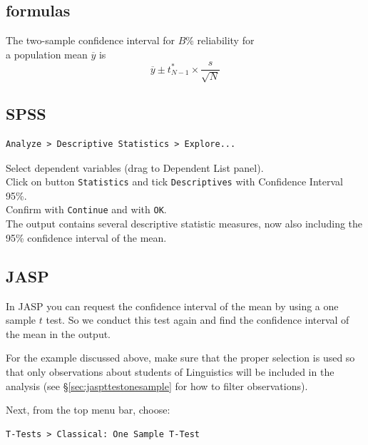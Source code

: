 \documentclass[
]{book}
\begin{document}
\hypertarget{sec:formulas13-2}{%
\subsection{formulas}\label{sec:formulas13-2}}

The two-sample confidence interval for \(B\)\% reliability for\\
a population mean \(\overline{y}\) is
\begin{equation}
    \overline{y} \pm t^*_{N-1} \times \frac{s}{\sqrt{N}}
  \label{eq:t-onesampleCI}
\end{equation}

\hypertarget{spss-11}{%
\subsection{SPSS}\label{spss-11}}

\begin{verbatim}
Analyze > Descriptive Statistics > Explore...
\end{verbatim}

Select dependent variables (drag to Dependent List panel).\\
Click on button \texttt{Statistics} and tick \texttt{Descriptives} with Confidence Interval
95\%.\\
Confirm with \texttt{Continue} and with \texttt{OK}.\\
The output contains several descriptive statistic measures, now also
including the 95\% confidence interval of the mean.

\hypertarget{jasp-11}{%
\subsection{JASP}\label{jasp-11}}

In JASP you can request the confidence interval of the mean by using a one sample \(t\) test.
So we conduct this test again and find the confidence interval of the mean in the output.

For the example discussed above, make sure that the proper selection is used so that only observations about students of Linguistics will be included in the analysis (see §\ref{sec:jaspttestonesample} for how to filter observations).

Next, from the top menu bar, choose:

\begin{verbatim}
T-Tests > Classical: One Sample T-Test
\end{verbatim}
\end{document}
